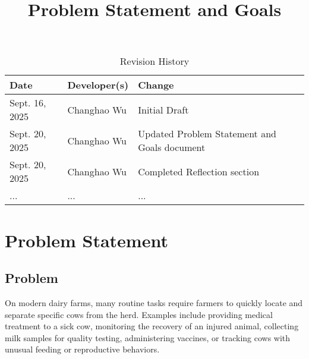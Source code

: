 \documentclass{article}
\title{Problem Statement and Goals\\\progname}
\author{\authname}
\date{}
\begin{document}
\maketitle

\begin{table}[hp]
    \caption{Revision History} \label{TblRevisionHistory}
        \begin{tabularx}{\textwidth}{llX}
        \toprule
        \textbf{Date} & \textbf{Developer(s)} & \textbf{Change}\\
        \midrule
            Sept. 16, 2025  & Changhao Wu           & Initial Draft                                 \\
            Sept. 20, 2025  & Changhao Wu           & Updated Problem Statement and Goals document  \\
            Sept. 20, 2025  & Changhao Wu           & Completed Reflection section                  \\
            ...             & ...                   & ...                                           \\
        \bottomrule
        \end{tabularx}
\end{table}

\section{Problem Statement}




\subsection{Problem}

    On modern dairy farms, many routine tasks require farmers to quickly locate and 
    separate specific cows from the herd. Examples include providing medical treatment 
    to a sick cow, monitoring the recovery of an injured animal, collecting milk samples 
    for quality testing, administering vaccines, or tracking cows with unusual feeding 
    or reproductive behaviors.  

    \setlength{\parskip}{0.6em} 
\end{document}

